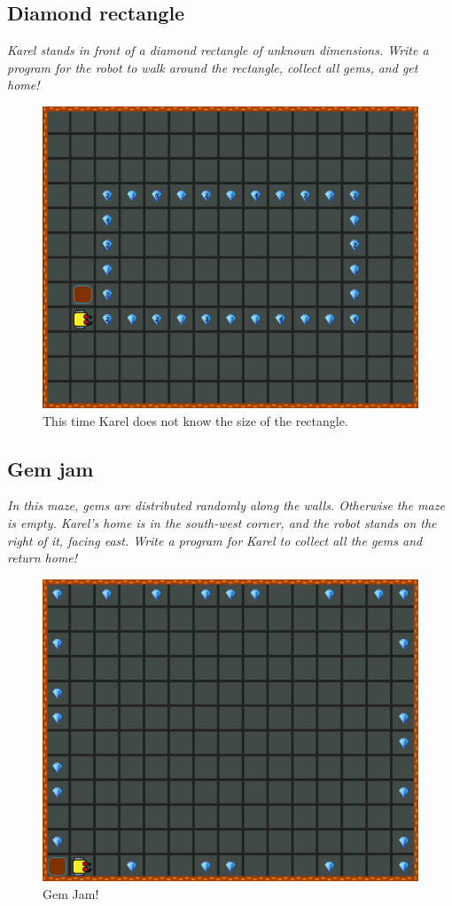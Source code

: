 {{\subsection{Diamond rectangle}

{\em Karel stands in front of a diamond rectangle of unknown dimensions. Write a program for the robot to walk around the rectangle, collect all gems, and get home!}


\begin{figure}[!ht]
\begin{center}
\includegraphics[height=0.4\textwidth]{img/f09.png}
\end{center}
\vspace{-4mm}
\caption{This time Karel does not know the size of the rectangle.}
\label{fig:f09}
\end{figure}
\vspace{-1cm}



\subsection{Gem jam}

{\em In this maze, gems are distributed randomly along the walls. Otherwise 
the maze is empty. Karel's home is in the south-west corner, and the robot 
stands on the right of it, facing east. Write a program for Karel to collect 
all the gems and return home!}

\begin{figure}[!ht]
\begin{center}
\includegraphics[height=0.4\textwidth]{img/f10.png}
\end{center}
\vspace{-4mm}
\caption{Gem Jam!}
\label{fig:f10}
\vspace{-1cm}
\end{figure}
\newpage


}}
